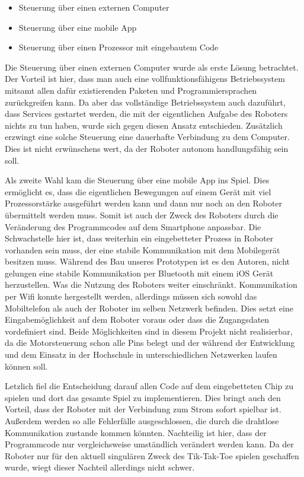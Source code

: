 \documentclass[conference,compsoc,final,a4paper]{IEEEtran}
\begin{document}
\begin{itemize}
  \item Steuerung über einen externen Computer
  \item Steuerung über eine mobile App
  \item Steuerung über einen Prozessor mit eingebautem Code
\end{itemize}

Die Steuerung über einen externen Computer wurde als erste Lösung betrachtet. Der Vorteil
ist hier, dass man auch eine vollfunktionsfähigens Betriebssystem mitsamt allen dafür existierenden
Paketen und Programmiersprachen zurückgreifen kann. Da aber das vollständige Betriebssystem auch
dazuführt, dass Services gestartet werden, die mit der eigentlichen Aufgabe des Roboters nichts zu
tun haben, wurde sich gegen diesen Ansatz entschieden. Zusätzlich erzwingt eine solche Steuerung
eine dauerhafte Verbindung zu dem Computer. Dies ist nicht erwünschens wert, da der Roboter autonom
handlungsfähig sein soll.

Als zweite Wahl kam die Steuerung über eine mobile App ins Spiel. Dies ermöglicht es, dass die
eigentlichen Bewegungen auf einem Gerät mit viel Prozessorstärke ausgeführt werden kann und dann nur
noch an den Roboter übermittelt werden muss. Somit ist auch der Zweck des Roboters
durch die Veränderung des Programmcodes auf dem Smartphone anpassbar. Die Schwachstelle hier ist,
dass weiterhin ein eingebetteter Prozess in Roboter vorhanden sein muss, der eine stabile
Kommunikation mit dem Mobilegerät besitzen muss. Während des Bau unseres Prototypen ist es den Autoren,
nicht gelungen eine stabile Kommunikation per Bluetooth mit einem iOS Gerät herzustellen.
Was die Nutzung des Roboters weiter einschränkt. Kommunikation per Wifi konnte hergestellt werden,
allerdings müssen sich sowohl das Mobiltelefon als auch der Roboter im 
selben Netzwerk befinden. Dies setzt eine Eingabemöglichkeit auf dem Roboter voraus oder dass
die Zugangsdaten vordefiniert sind. Beide Möglichkeiten sind in diesem Projekt nicht realisierbar,
da die Motorsteuerung schon alle Pins belegt und der während der Entwicklung und dem Einsatz in der
Hochschule in unterschiedlichen Netzwerken laufen können soll.

Letzlich fiel die Entscheidung darauf allen Code auf dem eingebetteten Chip zu spielen und dort
das gesamte Spiel zu implementieren. Dies bringt auch den Vorteil, dass der Roboter mit der Verbindung
zum Strom sofort spielbar ist. Außerdem werden so alle Fehlerfälle ausgeschlossen, die durch die
drahtlose Kommunikation zustande kommen könnten. Nachteilig ist hier, dass der Programmcode nur
vergleichsweise umständlich verändert werden kann. Da der Roboter nur für den aktuell singulären
Zweck des Tik-Tak-Toe spielen geschaffen wurde, wiegt dieser Nachteil allerdings nicht schwer.
\end{document}
